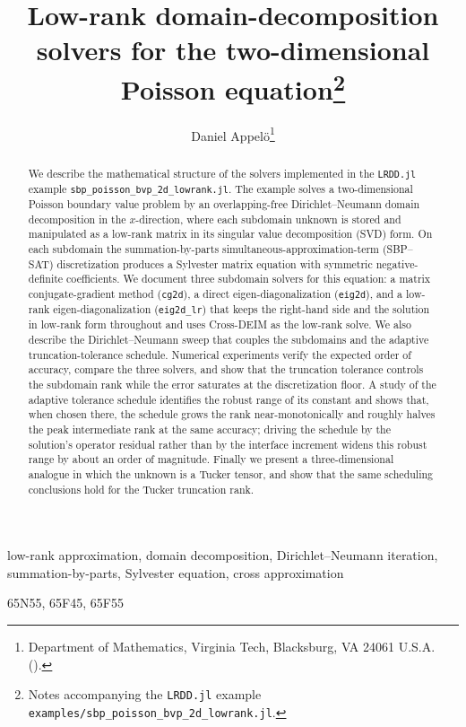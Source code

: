 \documentclass[hidelinks,onefignum,onetabnum]{siamart250211}
\title{Low-rank domain-decomposition solvers for the two-dimensional Poisson
equation\thanks{Notes accompanying the {\tt LRDD.jl} example
{\tt examples/sbp\_poisson\_bvp\_2d\_lowrank.jl}.}}
\author{Daniel Appel\"{o}\thanks{Department of Mathematics, Virginia Tech,
Blacksburg, VA 24061 U.S.A. (\email{appelo@vt.edu}).}}
\begin{document}
\maketitle

\begin{abstract}
We describe the mathematical structure of the solvers implemented in the
{\tt LRDD.jl} example {\tt sbp\_poisson\_bvp\_2d\_lowrank.jl}.  The example
solves a two-dimensional Poisson boundary value problem by an
overlapping-free Dirichlet--Neumann domain decomposition in the $x$-direction,
where each subdomain unknown is stored and manipulated as a low-rank matrix in
its singular value decomposition (SVD) form.  On each subdomain the
summation-by-parts simultaneous-approximation-term (SBP--SAT) discretization
produces a Sylvester matrix equation with symmetric negative-definite
coefficients.  We document three subdomain solvers for this equation: a
matrix conjugate-gradient method ({\tt cg2d}), a direct eigen-diagonalization
({\tt eig2d}), and a low-rank eigen-diagonalization ({\tt eig2d\_lr}) that keeps
the right-hand side and the solution in low-rank form throughout and uses
Cross-DEIM as the low-rank solve.  We also describe the Dirichlet--Neumann
sweep that couples the subdomains and the adaptive truncation-tolerance
schedule.  Numerical experiments verify the expected order of accuracy, compare
the three solvers, and show that the truncation tolerance controls
the subdomain rank while the error saturates at the discretization floor.  A
study of the adaptive tolerance schedule identifies the robust range of its
constant and shows that, when chosen there, the schedule grows the rank
near-monotonically and roughly halves the peak intermediate rank at the same
accuracy; driving the schedule by the solution's operator residual rather than by
the interface increment widens this robust range by about an order of magnitude.
Finally we present a three-dimensional analogue in which the unknown is a Tucker
tensor, and show that the same scheduling conclusions hold for the Tucker
truncation rank.
\end{abstract}

\begin{keywords}
low-rank approximation, domain decomposition, Dirichlet--Neumann iteration,
summation-by-parts, Sylvester equation, cross approximation
\end{keywords}

\begin{MSCcodes}
65N55, 65F45, 65F55
\end{MSCcodes}
\end{document}
